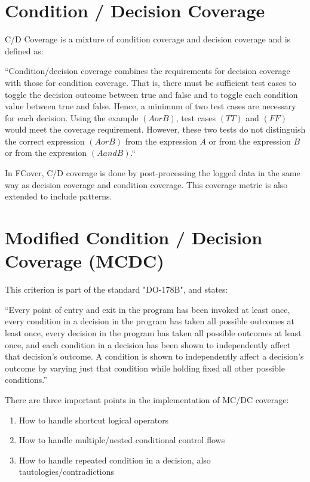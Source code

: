 \documentclass[12pt,a4paper]{report}
\begin{document}
\section{Condition / Decision Coverage}
C/D Coverage is a mixture of condition coverage and decision coverage and is defined as:

“Condition/decision coverage combines the requirements for decision coverage with those for condition coverage. That is, there must be sufficient test cases to toggle the decision outcome between true and false and to toggle each condition value between true and false. Hence, a minimum of two test cases are necessary for each decision. Using the example $(A or B)$, test cases $(TT)$ and $(FF)$ would meet the coverage requirement. However, these two tests do not distinguish the correct expression $(A or B)$ from the expression $A$ or from the expression $B$ or from the expression $(A and B)$.“\cite{KellyJ.:2001:PTM:886632} 

In FCover, C/D coverage is done by post-processing the logged data in the same way as decision coverage and condition coverage. This coverage metric is also extended to include patterns.

\section{Modified Condition / Decision Coverage (MCDC)}
This criterion is part of the standard "DO-178B", and states:

“Every point of entry and exit in the program has been invoked at least once, every condition in a decision in the program has taken all possible outcomes at least once, every decision in the program has taken all possible outcomes at least once, and each condition in a decision has been shown to independently affect that decision's outcome. A condition is shown to independently affect a decision's outcome by varying just that condition while holding fixed all other possible conditions.”\cite{cast-10}

There are three important points in the implementation of MC/DC coverage:

\begin{enumerate}
 \item How to handle shortcut logical operators
 \item How to handle multiple/nested conditional control flows
 \item How to handle repeated condition in a decision, also tautologies/contradictions
\end{enumerate}
 
\end{document}
